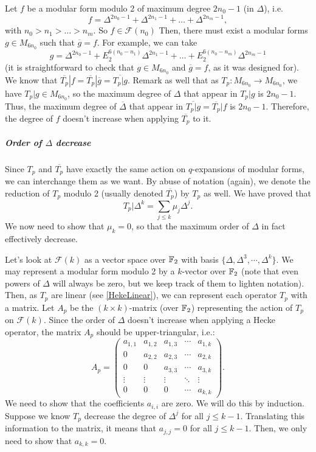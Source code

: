 Let $f$ be a modular form modulo 2 of maximum degree $2n_0-1$ (in $\Delta$), i.e. 
$$
f = \Delta^{2n_0-1} + \Delta^{2n_1-1} + \dots + \Delta^{2n_m-1},
$$ with $n_0 > n_1 > \dots > n_m$.
So $f \in \mathcal{F}(n_0)$
Then, there must exist a modular forms $g \in M_{6n_0}$ such that $\overline{g}=f$.
For example, we can take 
$$
g = \Delta^{2n_0-1} + E_2^{6(n_0-n_1)}\Delta^{2n_1-1} + \dots + E_2^{6(n_0-n_m)}\Delta^{2n_m-1}
$$
(it is straightforward to check that $g\in M_{6n_0}$ and $\overline{g}=f$, as it was designed for).
We know that $\overline{T_p}|f = \overline{T_p}|\overline{g} = \overline{T_p|g}$.
Remark as well that as $T_p: M_{6n_0} \to M_{6n_0}$, we have $T_p|g \in M_{6n_0}$, so the maximum degree of $\Delta$ that appear in $T_p|g$ is $2n_0-1$.
Thus, the maximum degree of $\overline{\Delta}$ that appear in $\overline{T_p|g} = \overline{T_p}|f$ is $2n_0-1$.
Therefore, the degree of $f$ doesn't increase when applying $\overline{T_p}$ to it.



\subparagraph{Order of $\Delta$ decrease}
\label{orderDecrease}
Since $T_p$ and $\overline{T_p}$ have exactly the same action on $q$-expansions of modular forms, we can interchange them as we want.
By abuse of notation (again), we denote the reduction of $T_p$ modulo 2 (usually denoted $\overline{T_p}$) by $T_p$ as well.
We have proved that 
$$
T_p| \Delta^k = \sum_{j \leq k} \mu_j \Delta^j.
$$
We now need to show that $\mu_k = 0$, so that the maximum order of $\Delta$ in fact effectively decrease.

Let's look at $\mathcal{F}(k)$ as a vector space over $\mathbb{F}_2$ with basis $\{ \Delta, \Delta^3, \cdots, \Delta^k \}$.
We may represent a modular form modulo 2 by a $k$-vector over $\mathbb{F}_2$ (note that even powers of $\Delta$ will always be zero, but we keep track of them to lighten notation).
Then, as $T_p$ are linear (see \ref{HekeLinear}), we can represent each operator $T_p$ with a matrix.
Let $A_p$ be the $(k \times k)$-matrix (over $\mathbb{F}_2$) representing the action of $T_p$ on $\mathcal{F}(k)$.
Since the order of $\Delta$ doesn't increase when applying a Hecke operator, the matrix $A_p$ should be upper-triangular, i.e.:
$$
A_p = 
\begin{pmatrix}
a_{1,1} & a_{1,2} & a_{1,3} & \cdots & a_{1,k} \\
   0    & a_{2,2} & a_{2,3} & \cdots & a_{2,k} \\
   0    &    0    & a_{3,3} & \cdots & a_{3,k} \\
\vdots  & \vdots  & \vdots  & \ddots & \vdots  \\
   0    &    0    &    0    & \cdots & a_{k,k}
\end{pmatrix}.
$$
We need to show that the coefficients $a_{i,i}$ are zero.
We will do this by induction.
Suppose we know $T_p$ decrease the degree of $\Delta^j$ for all $j \leq k-1$.
Translating this information to the matrix, it means that $a_{j,j}=0$ for all $j \leq k-1$.
Then, we only need to show that $a_{k,k}=0$.

